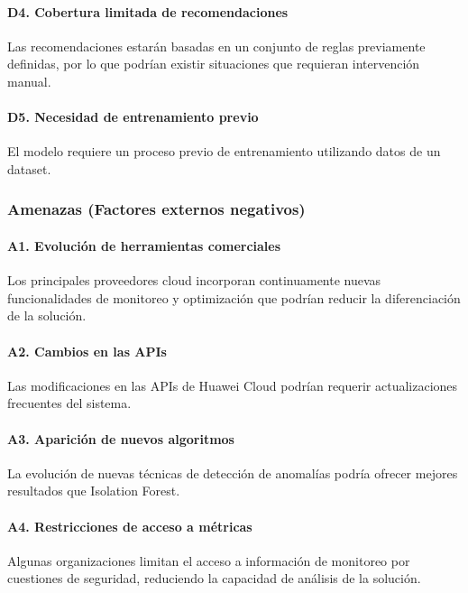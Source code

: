\paragraph*{D4. Cobertura limitada de recomendaciones}

Las recomendaciones estarán basadas en un conjunto de reglas previamente definidas, por lo que podrían existir situaciones que requieran intervención manual.

\paragraph*{D5. Necesidad de entrenamiento previo}

El modelo requiere un proceso previo de entrenamiento utilizando datos de un dataset.

\subsubsection{Amenazas (Factores externos negativos)}

\paragraph*{A1. Evolución de herramientas comerciales}

Los principales proveedores cloud incorporan continuamente nuevas funcionalidades de monitoreo y optimización que podrían reducir la diferenciación de la solución.

\paragraph*{A2. Cambios en las APIs}

Las modificaciones en las APIs de Huawei Cloud podrían requerir actualizaciones frecuentes del sistema.

\paragraph*{A3. Aparición de nuevos algoritmos}

La evolución de nuevas técnicas de detección de anomalías podría ofrecer mejores resultados que Isolation Forest.

\paragraph*{A4. Restricciones de acceso a métricas}

Algunas organizaciones limitan el acceso a información de monitoreo por cuestiones de seguridad, reduciendo la capacidad de análisis de la solución.

